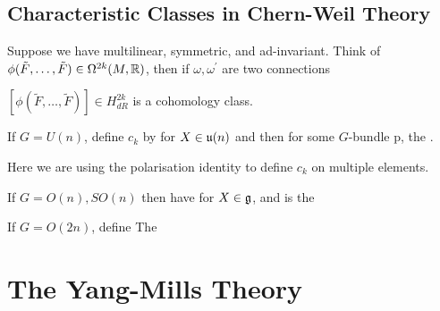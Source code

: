 \documentclass{article}
\begin{document}
\subsection{Characteristic Classes in Chern-Weil Theory}

\begin{lemma}
Suppose we have 
multilinear, symmetric, and ad-invariant. Think of $\phi(\tilde{F}, \dots, \tilde{F}) \in \Omega^{2k}(M,\mathbb{R})$, then if $\omega, \omega^\prime$ are two connections
\end{lemma}

\begin{corollary}
	$[\phi(\tilde{F}, \dots, \tilde{F})]\in H^{2k}_{dR}$ is a cohomology class. 
\end{corollary}

\begin{example}
	If $G=U(n)$, define $c_k$ by 
for $X \in \mathfrak{u}(n)$ and then 
for some $G$-bundle p, the . 
\end{example}

\begin{remark}
	Here we are using the polarisation identity to define $c_k$ on multiple elements. 
\end{remark}

\begin{example}
	If $G= O(n), SO(n)$ then have 
for $X \in \mathfrak{g}$, and 
is the 
\end{example}

\begin{example}
	If $G=O(2n)$, define 
The  
\end{example}
\section{The Yang-Mills Theory}
\end{document}

